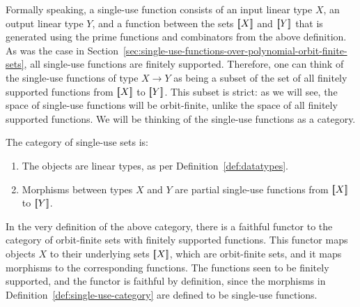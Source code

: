    


Formally speaking, a single-use function consists of an input linear type $X$, an output linear type $Y$, and a function between the sets $[{\kern-0.45ex}[X]{\kern-0.45ex}]$ and $[{\kern-0.45ex}[Y]{\kern-0.45ex}]$ that is generated using the prime functions and combinators from the above definition.  As was the case in Section~\ref{sec:single-use-functions-over-polynomial-orbit-finite-sets}, all single-use functions are  finitely supported.  Therefore, one can think of the single-use functions of type $X \to Y$ as being a subset of the set of all finitely supported functions from $[{\kern-0.45ex}[X]{\kern-0.45ex}]$ to $[{\kern-0.45ex}[Y]{\kern-0.45ex}]$. This subset is strict: as we will see, the space of single-use functions will be orbit-finite, unlike the space of all finitely supported functions. We will be thinking of the single-use functions as a category.




\begin{definition}\label{def:single-use-category}
    The category of single-use sets is:
    \begin{enumerate}
        \item The objects are linear types, as per Definition~\ref{def:datatypes}.
        \item Morphisms between types $X$ and $Y$ are partial single-use functions from $[{\kern-0.45ex}[X]{\kern-0.45ex}]$ to $[{\kern-0.45ex}[Y]{\kern-0.45ex}]$.
    \end{enumerate}
\end{definition}

In the very definition of the above category, there is a faithful functor to the category of  orbit-finite sets with finitely supported functions. This functor maps objects $X$ to their underlying sets $[{\kern-0.45ex}[X]{\kern-0.45ex}]$, which are orbit-finite sets, and it maps morphisms to the corresponding functions. The functions seen to be finitely supported, and the functor is faithful  by definition, since the morphisms in Definition~\ref{def:single-use-category} are defined to be single-use functions. 






